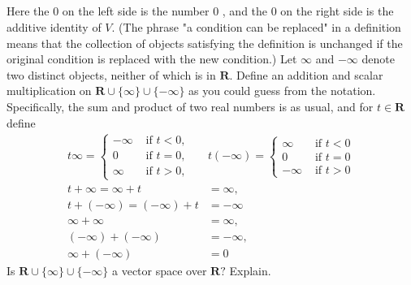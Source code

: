 \documentclass[a4paper]{article}
\begin{document}
\subsection{}
Here the 0 on the left side is the number 0 , and the 0 on the right side is the additive identity of $V$. (The phrase "a condition can be replaced" in a definition means that the collection of objects satisfying the definition is unchanged if the original condition is replaced with the new condition.)
Let $\infty$ and $-\infty$ denote two distinct objects, neither of which is in $\mathbf{R}$. Define an addition and scalar multiplication on $\mathbf{R} \cup\{\infty\} \cup\{-\infty\}$ as you could guess from the notation. Specifically, the sum and product of two real numbers is as usual, and for $t \in \mathbf{R}$ define
\[
    \begin{aligned}
        t \infty=\left\{\begin{array}{ll}
            -\infty & \text { if } t<0, \\
            0       & \text { if } t=0, \\
            \infty  & \text { if } t>0,
        \end{array}\right. & t(-\infty)=\left\{\begin{array}{ll}
            \infty  & \text { if } t<0 \\
            0       & \text { if } t=0 \\
            -\infty & \text { if } t>0
        \end{array}\right. \\
        t+\infty=\infty+t                                 & =\infty,                                            \\
        t+(-\infty)=(-\infty)+t                           & =-\infty                                            \\
        \infty+\infty                                     & =\infty,                                            \\
        (-\infty)+(-\infty)                               & =-\infty,                                           \\
        \infty+(-\infty)                                  & =0
    \end{aligned}
\]
Is $\mathbf{R} \cup\{\infty\} \cup\{-\infty\}$ a vector space over $\mathbf{R} ?$ Explain.
\paragraph{}
\end{document}
